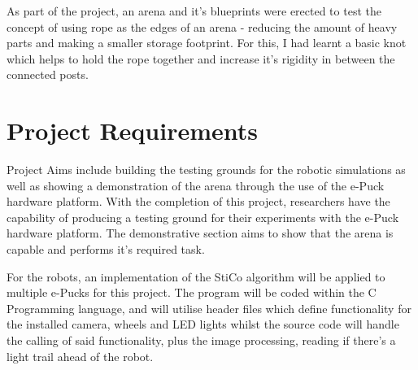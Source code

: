 As part of the project, an arena and it's blueprints were erected to test the
concept of using rope as the edges of an arena - reducing the amount of heavy
parts and making a smaller storage footprint.  For this, I had learnt a basic
knot which helps to hold the rope together and increase it's rigidity in
between the connected posts.

\section{Project Requirements}
Project Aims include building the testing grounds for the robotic simulations as
well as showing a demonstration of the arena through the use of the e-Puck
hardware platform.  With the completion of this project, researchers have the
capability of producing a testing ground for their experiments with the e-Puck
hardware platform.  The demonstrative section aims to show that the arena is
capable and performs it's required task.

For the robots, an implementation of the StiCo algorithm will be applied to
multiple e-Pucks for this project.  The program will be coded within the C
Programming language, and will utilise header files which define functionality
for the installed camera, wheels and LED lights whilst the source code will
handle the calling of said functionality, plus the image processing,
reading if there's a light trail ahead of the robot.